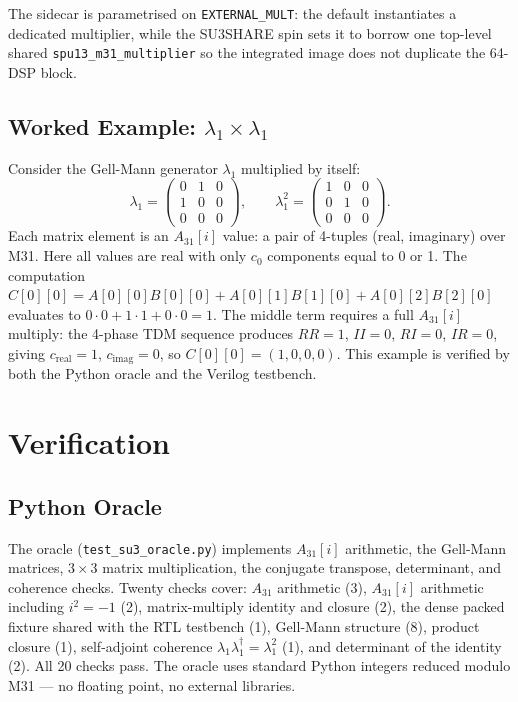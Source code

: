 \documentclass[conference]{IEEEtran}
\begin{document}
The sidecar is parametrised on \texttt{EXTERNAL\_MULT}: the default
instantiates a dedicated multiplier, while the SU3SHARE spin sets it to
borrow one top-level shared \texttt{spu13\_m31\_multiplier} so the
integrated image does not duplicate the 64-DSP block.

\subsection{Worked Example: $\lambda_1 \times \lambda_1$}

Consider the Gell-Mann generator $\lambda_1$ multiplied by itself:
\begin{equation}
\lambda_1 = \begin{pmatrix} 0&1&0\\ 1&0&0\\ 0&0&0 \end{pmatrix},
\qquad
\lambda_1^2 = \begin{pmatrix} 1&0&0\\ 0&1&0\\ 0&0&0 \end{pmatrix}.
\end{equation}
Each matrix element is an $A_{31}[i]$ value: a pair of 4-tuples
(real, imaginary) over M31. Here all values are real with only $c_0$
components equal to 0 or 1. The computation
$C[0][0] = A[0][0]B[0][0] + A[0][1]B[1][0] + A[0][2]B[2][0]$ evaluates to
$0\cdot0 + 1\cdot1 + 0\cdot0 = 1$. The middle term requires a full
$A_{31}[i]$ multiply: the 4-phase TDM sequence produces $RR=1$, $II=0$,
$RI=0$, $IR=0$, giving $c_{\mathrm{real}}=1$, $c_{\mathrm{imag}}=0$, so
$C[0][0] = (1,0,0,0)$. This example is verified by both the Python oracle
and the Verilog testbench.

\section{Verification}

\subsection{Python Oracle}

The oracle (\texttt{test\_su3\_oracle.py}) implements $A_{31}[i]$
arithmetic, the Gell-Mann matrices, $3\times3$ matrix multiplication, the
conjugate transpose, determinant, and coherence checks. Twenty checks
cover: $A_{31}$ arithmetic (3), $A_{31}[i]$ arithmetic including
$i^2 = -1$ (2), matrix-multiply identity and closure (2), the dense packed
fixture shared with the RTL testbench (1), Gell-Mann structure (8), product
closure (1), self-adjoint coherence
$\lambda_1\lambda_1^\dagger = \lambda_1^2$ (1), and determinant of the
identity (2). All 20 checks pass. The oracle uses standard Python integers
reduced modulo M31 --- no floating point, no external libraries.
\end{document}
